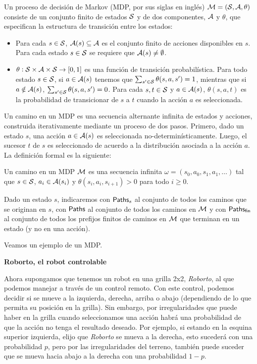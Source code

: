 \begin{definition}
	Un proceso de decisión de Markov (MDP, por sus siglas en inglés) $\mathcal{M} =(\mathcal{S}, \mathcal{A}, \theta)$ consiste de un conjunto finito de estados $\mathcal{S}$ y de dos componentes, $\mathcal{A}$ y $\theta$, que especifican la estructura de transición entre los estados:
	\begin{itemize}
		\item Para cada $s \in \mathcal{S}$, $\mathcal{A}(s) \subseteq \mathcal{A}$ es el conjunto finito de
		      acciones disponibles en $s$. Para cada estado $s \in \mathcal{S}$ se requiere que
		      $\mathcal{A}(s) \neq \emptyset$. %
		\item $\theta : \mathcal{S} \times \mathcal{A} \times \mathcal{S} \rightarrow [0,1]$ es una función de transición probabilística. Para todo estado $s \in \mathcal{S}$, si $a \in \mathcal{A}(s)$ tenemos que $\sum_{s' \in \mathcal{S}} \theta(s, a, s') = 1$, mientras que si $a \notin \mathcal{A}(s)$, $\sum_{s' \in \mathcal{S}} \theta(s, a, s') = 0$. Para cada $s, t \in \mathcal{S}$ y $a \in \mathcal{A}(s)$, $\theta(s, a, t)$ es la probabilidad de transicionar de $s$ a $t$ cuando la acción $a$ es seleccionada.
	\end{itemize}
\end{definition}

Un camino en un MDP es una secuencia alternante infinita de estados y acciones,
construida iterativamente mediante un proceso de dos pasos. Primero, dado un
estado $s$, una acción $a \in \mathcal{A}(s)$ es seleccionada no-determinísticamente.
Luego, el sucesor $t$ de $s$ es seleccionado de acuerdo a la distribución
asociada a la acción $a$. La definición formal es la siguiente:

\begin{definition}
	Un camino en un MDP $\mathcal{M}$ es una secuencia infinita $\omega = (s_0, a_0, s_1, a_1, \dots)$ tal que $s \in \mathcal{S}$, $a_i \in \mathcal{A}(s_i)$ y $\theta(s_i, a_i, s_{i+1}) > 0$ para todo $i \geq 0$.

	Dado un estado $s$, indicaremos con $\textsf{Paths}_s$ al conjunto de todos los caminos
	que se originan en $s$, con $\textsf{Paths}$ al conjunto de todos los caminos en $\mathcal{M}$ y
	con $\textsf{Paths}_\textsf{fin}$ al conjunto de todos los prefijos finitos de caminos en $\mathcal{M}$
	que terminan en un estado (y no en una acción).
\end{definition}

Veamos un ejemplo de un MDP.

\textbf{Roborto, el robot controlable}

Ahora supongamos que tenemos un robot en una grilla 2x2, \emph{Roborto}, al que
podemos manejar a través de un control remoto. Con este control, podemos
decidir si se mueve a la izquierda, derecha, arriba o abajo (dependiendo de lo
que permita su posición en la grilla). Sin embargo, por irregularidades que
puede haber en la grilla cuando seleccionamos una acción habrá una probabilidad
de que la acción no tenga el resultado deseado. Por ejemplo, si estando en la
esquina superior izquierda, elijo que \emph{Roborto} se mueva a la derecha,
esto sucederá con una probabilidad $p$, pero por las irregularidades del
terreno, también puede suceder que se mueva hacia abajo a la derecha con una
probabilidad $1 - p$.

